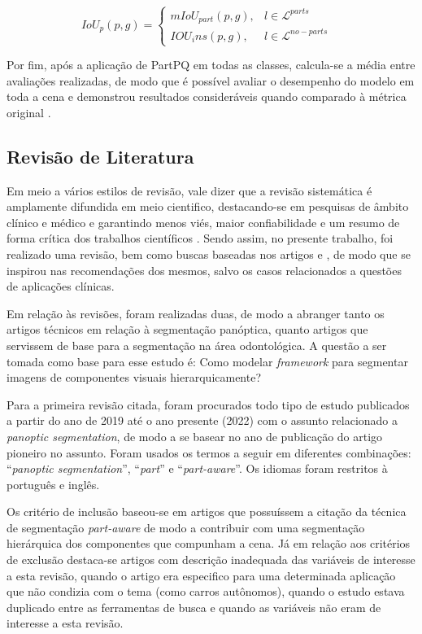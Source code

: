 \begin{equation}
\label{proposal:avaliation:eq:2}
    IoU_p(p,g)= \left\{\begin{matrix}
        mIoU_{part}(p,g), & l \in \mathcal{L}^{parts}    & \\ 
        IOU_ins(p,g),        & l \in \mathcal{L}^{no-parts} & 
    \end{matrix}\right.
\end{equation}

Por fim, após a aplicação de PartPQ em todas as classes, calcula-se a média entre avaliações realizadas, de modo que é possível avaliar o desempenho do modelo em toda a cena e demonstrou resultados consideráveis quando comparado à métrica original \cite{DeGeus2021}.

\subsection{Revisão de Literatura}
\label{proposal:revision}

Em meio a vários estilos de revisão, vale dizer que a revisão sistemática é amplamente difundida em meio cientifico, destacando-se em pesquisas de âmbito clínico e médico e garantindo menos viés, maior confiabilidade e um resumo de forma crítica dos trabalhos científicos \cite{barbosa2019}. Sendo assim, no presente trabalho, foi realizado uma revisão, bem como buscas baseadas nos artigos \cite{barbosa2019} e \cite{liberati2009}, de modo que se inspirou nas recomendações dos mesmos, salvo os casos relacionados a questões de aplicações clínicas.

Em relação às revisões, foram realizadas duas, de modo a abranger tanto os artigos técnicos em relação à segmentação panóptica, quanto artigos que servissem de base para a segmentação na área odontológica. A questão a ser tomada como base para esse estudo é: Como modelar \textit{framework} para segmentar imagens de componentes visuais hierarquicamente?

Para a primeira revisão citada, foram procurados todo tipo de estudo publicados a partir do ano de 2019 até o ano presente (2022) com o assunto relacionado a \textit{panoptic segmentation}, de modo a se basear no ano de publicação do artigo pioneiro \cite{Kirillov2019a} no assunto. Foram usados os termos a seguir em diferentes combinações: ``\textit{panoptic segmentation}'', ``\textit{part}'' e ``\textit{part-aware}''. Os idiomas foram restritos à português e inglês.

Os critério de inclusão baseou-se em artigos que possuíssem a citação da técnica de segmentação \textit{part-aware} de modo a contribuir com uma segmentação hierárquica dos componentes que compunham a cena. Já em relação aos critérios de exclusão destaca-se artigos com descrição inadequada das variáveis de interesse a esta revisão, quando o artigo era especifico para uma determinada aplicação que não condizia com o tema (como carros autônomos), quando o estudo estava duplicado entre as ferramentas de busca e quando as variáveis não eram de interesse a esta revisão.

